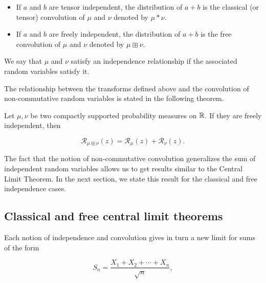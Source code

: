     \begin{itemize}
        \item If $a$ and $b$ are tensor independent, the distribution of $a+b$ is the classical (or tensor) convolution of $\mu$ and $\nu$ denoted by $\mu*\nu$.
        
        
        
        \item If $a$ and $b$ are freely independent, the distribution of $a+b$ is the free convolution of $\mu$ and $\nu$ denoted by $\mu \boxplus \nu$.
    \end{itemize}

    We say that $\mu$ and $\nu$ satisfy an independence relationship if the associated random variables satisfy it. 
    
    The relationship between the transforms defined above and the convolution of non-commutative random variables is stated in the following theorem.

    \begin{theorem}
        Let $\mu,\nu$ be two compactly supported probability measures on $\mathbb R$. If they are freely independent, then
            
            \[ \mathcal R_{\mu \boxplus \nu}(z) = \mathcal R_{\mu}(z) + \mathcal R_{\nu} (z).\]
    \end{theorem}

    The fact that the notion of non-commutative convolution generalizes the sum of independent random variables allows us to get results similar to the Central Limit Theorem. In the next section, we state this result for the classical and free independence cases.

\subsection{Classical and free central limit theorems}

    Each notion of independence and convolution gives in turn a new limit for sums of the form

    \[ S_n = \frac{X_1 + X_2 + \cdots + X_n}{\sqrt{n}}, \]

